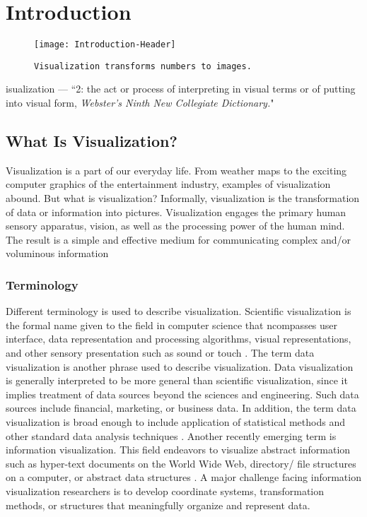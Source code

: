 \chapter{Introduction}
\begin{figure}[ht]
 \hfill\begin{minipage}{.5\textwidth}\centering
  \texttt{[image: Introduction-Header]}
  \caption{\texttt{Visualization transforms numbers to images.}}
 \end{minipage}
\end{figure}

isualization — “2: the act or process of interpreting in
visual terms or of putting into visual form, \emph{Webster’s Ninth New Collegiate Dictionary.}"

\section{What Is Visualization?}
Visualization is a part of our everyday life. From weather maps to the exciting computer graphics of the entertainment industry, examples of visualization abound.
But what is visualization? Informally, visualization is the transformation of data or information into pictures.
Visualization engages the primary human sensory apparatus, vision, as well as the processing power of the human mind.
The result is a simple and effective medium for communicating complex and/or voluminous information

\subsection{Terminology}
Different terminology is used to describe visualization. Scientific visualization is the formal name given to the field in computer science that  ncompasses user interface, data representation and processing algorithms, visual representations, and other sensory presentation such as sound or touch \cite{McCormick87}.
The term data visualization is another phrase used to describe visualization. Data visualization is generally interpreted to be more general than scientific visualization, since it implies treatment of data sources beyond the sciences and engineering. Such data sources include financial, marketing, or business data. In addition, the term data visualization is broad enough to include application of statistical methods and other standard data analysis techniques \cite{Rosenblum94}.
Another recently emerging term is information visualization. 
This field endeavors to visualize abstract information such as hyper-text documents on the World Wide Web, directory/ file structures on a computer, or abstract data structures \cite{InfoVis95}.
A major challenge facing information visualization researchers is to develop coordinate systems, transformation methods, or structures that meaningfully organize and represent data.

